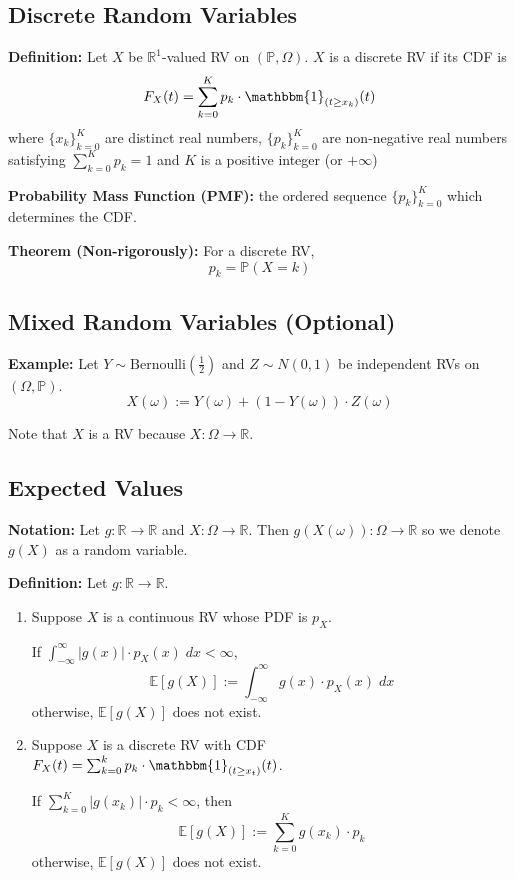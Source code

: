 \documentclass[12pt]{article}
\renewcommand{\P}{\mathbb{P}}
\newcommand{\R}{\mathbb{R}}
\newcommand{\E}{\mathbb{E}}
\newcommand{\ind}{\mathbbm{1}}
\begin{document}
\subsection{Discrete Random Variables}
\textbf{Definition:} Let $X$ be $\R^1$-valued RV on $(\P, \Omega)$. $X$ is a discrete RV if its CDF is
\[F_X(t) = \sum_{k=0}^K p_k \cdot \ind_{(t \geq x_k)}(t)\]
where $\{x_k\}_{k=0}^K$ are distinct real numbers, $\{p_k\}_{k=0}^K$ are non-negative real numbers satisfying $\sum_{k=0}^K p_k = 1$ and $K$ is a positive integer (or $+\infty$)

\textbf{Probability Mass Function (PMF):} the ordered sequence $\{p_k\}_{k=0}^K$ which determines the CDF. 

\textbf{Theorem (Non-rigorously):} For a discrete RV, 
\[p_k = \P(X = k)\]

\subsection{Mixed Random Variables (Optional)}
\textbf{Example:} Let $Y \sim \text{Bernoulli}(\frac{1}{2})$ and $Z\sim N(0,1)$ be independent RVs on $(\Omega, \P)$. 
\[X(\omega) := Y(\omega) + (1 - Y(\omega)) \cdot Z(\omega)\]

Note that $X$ is a RV because $X : \Omega \to \R$. 

\subsection{Expected Values}
\textbf{Notation:} Let $g: \R \to \R$ and $X: \Omega \to \R$. Then $g(X(\omega)) : \Omega \to \R$ so we denote $g(X)$ as a random variable. 

\textbf{Definition:}
Let $g : \R \to \R$. 

\begin{enumerate}
    \item Suppose $X$ is a continuous RV whose PDF is $p_X$.
    
    If $\int_{-\infty}^{\infty} |g(x)| \cdot p_X(x)\; dx < \infty$, 
    \[\E[g(X)] := \int_{-\infty}^{\infty} g(x)\cdot p_X(x)\; dx\]
    otherwise, $\E[g(X)]$ does not exist.

    \item Suppose $X$ is a discrete RV with CDF $F_X(t) = \sum_{k=0}^k p_k \cdot \ind_{(t\geq x_t)}(t)$. 
    
    If $\sum_{k=0}^K |g(x_k)| \cdot p_k < \infty$, then 
    \[\E[g(X)] := \sum_{k=0}^K g(x_k) \cdot p_k\]
    otherwise, $\E[g(X)]$ does not exist.
\end{enumerate}
\end{document}

